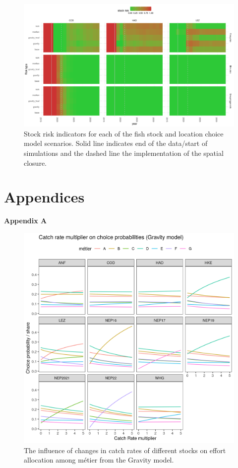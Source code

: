 \documentclass[12pt, halfline, a4paper]{ouparticle}
\begin{document}
\begin{figure}[!ht]
	\centering
	\includegraphics[width=1\linewidth]{figures/stock_risks}
	\caption{Stock risk indicators for each of the fish stock and location
		choice model scenarios. Solid
		line indicates end of the data/start of simulations and the
		dashed line the implementation of the spatial closure.} 
	\label{fig:risk}
\end{figure}	

\clearpage

\section{Appendices}

\textbf{Appendix A}

\begin{figure}[!ht]
	\centering
	\includegraphics[width=1\linewidth]{figures/Gravity_Metier_Catch_Rate_Multiplier}
	\caption{The influence of changes in catch rates of different stocks on
	effort allocation among métier from the Gravity model.} 
	\label{fig:Grav_CR}
\end{figure}	
\end{document}
